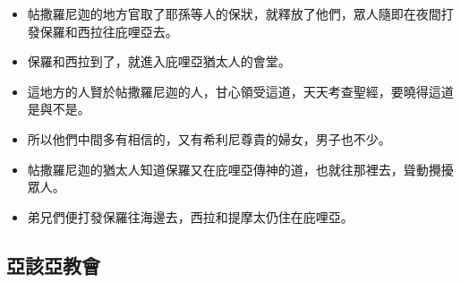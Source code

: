 \begin{itemize}%
\itemsep-.25em 
\item 帖撒羅尼迦的地方官取了耶孫等人的保狀，就釋放了他們，眾人隨即在夜間打發保羅和西拉往庇哩亞去。
\item 保羅和西拉到了，就進入庇哩亞猶太人的會堂。
\item 這地方的人賢於帖撒羅尼迦的人，甘心領受這道，天天考查聖經，要曉得這道是與不是。 
\item 所以他們中間多有相信的，又有希利尼尊貴的婦女，男子也不少。
\item 帖撒羅尼迦的猶太人知道保羅又在庇哩亞傳神的道，也就往那裡去，聳動攪擾眾人。
\item 弟兄們便打發保羅往海邊去，西拉和提摩太仍住在庇哩亞。 
\end{itemize}

\subsection{亞該亞教會}
